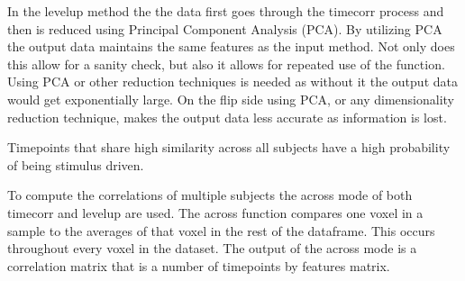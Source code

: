 
In the levelup method the the data first goes through the timecorr process and then is reduced using Principal Component Analysis (PCA). By utilizing PCA the output data maintains the same features as the input method. Not only does this allow for a sanity check, but also it allows for repeated use of the function. Using PCA or other reduction techniques is needed as without it the output data would get exponentially large. On the flip side using PCA, or any dimensionality reduction technique, makes the output data less accurate as information is lost. 




Timepoints that share high similarity across all subjects have a high probability of being stimulus driven.

To compute the correlations of multiple subjects the across mode of both timecorr and levelup are used. The across function compares one voxel in a sample to the averages of that voxel in the rest of the dataframe. This occurs throughout every voxel in the dataset. The output of the across mode is a correlation matrix that is a number of timepoints by features matrix.

